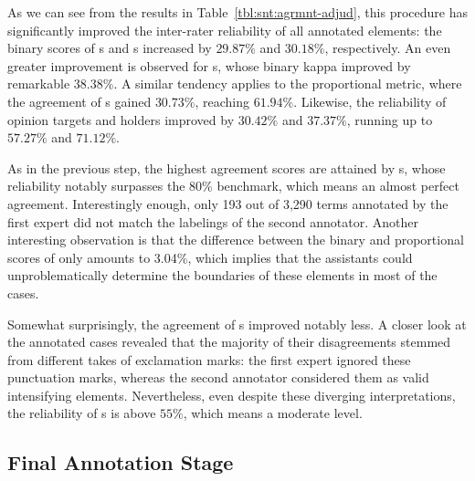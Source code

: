 As we can see from the results in Table~\ref{tbl:snt:agrmnt-adjud},
this procedure has significantly improved the inter-rater reliability
of all annotated elements: the binary scores of s
and s increased by $29.87\%$ and $30.18\%$,
respectively.  An even greater improvement is observed for
s, whose binary kappa improved by remarkable
$38.38\%$.  A similar tendency applies to the proportional metric,
where the agreement of s gained $30.73\%$,
reaching $61.94\%$.  Likewise, the reliability of opinion targets and
holders improved by $30.42\%$ and $37.37\%$, running up to $57.27\%$
and $71.12\%$.



As in the previous step, the highest agreement scores are attained by
s, whose reliability notably surpasses the 80\%
benchmark, which means an almost perfect agreement.  Interestingly
enough, only 193 out of 3,290 terms annotated by the first expert did
not match the labelings of the second annotator.  Another interesting
observation is that the difference between the binary and proportional
scores of  only amounts to 3.04\%, which implies
that the assistants could unproblematically determine the boundaries
of these elements in most of the cases.

Somewhat surprisingly, the agreement of s
improved notably less.  A closer look at the annotated cases revealed
that the majority of their disagreements stemmed from different takes
of exclamation marks: the first expert ignored these punctuation
marks, whereas the second annotator considered them as valid
intensifying elements.  Nevertheless, even despite these diverging
interpretations, the reliability of s is above
$55\%$, which means a moderate level.

\subsection{Final Annotation Stage}\label{subsec:eval-final-annotation}

